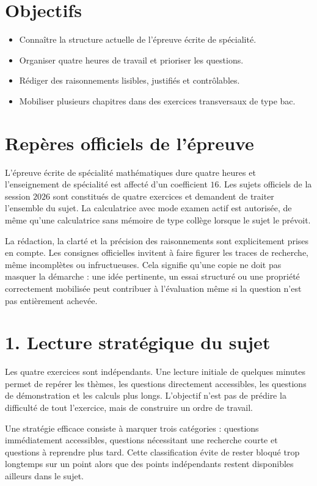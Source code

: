 
\section{Objectifs}
\begin{itemize}
\item Connaître la structure actuelle de l’épreuve écrite de spécialité.
\item Organiser quatre heures de travail et prioriser les questions.
\item Rédiger des raisonnements lisibles, justifiés et contrôlables.
\item Mobiliser plusieurs chapitres dans des exercices transversaux de type bac.
\end{itemize}

\section{Repères officiels de l’épreuve}
L’épreuve écrite de spécialité mathématiques dure quatre heures et l’enseignement de spécialité est affecté d’un coefficient $16$. Les sujets officiels de la session $2026$ sont constitués de quatre exercices et demandent de traiter l’ensemble du sujet. La calculatrice avec mode examen actif est autorisée, de même qu’une calculatrice sans mémoire de type collège lorsque le sujet le prévoit.

La rédaction, la clarté et la précision des raisonnements sont explicitement prises en compte. Les consignes officielles invitent à faire figurer les traces de recherche, même incomplètes ou infructueuses. Cela signifie qu’une copie ne doit pas masquer la démarche : une idée pertinente, un essai structuré ou une propriété correctement mobilisée peut contribuer à l’évaluation même si la question n’est pas entièrement achevée.

\section{1. Lecture stratégique du sujet}
Les quatre exercices sont indépendants. Une lecture initiale de quelques minutes permet de repérer les thèmes, les questions directement accessibles, les questions de démonstration et les calculs plus longs. L’objectif n’est pas de prédire la difficulté de tout l’exercice, mais de construire un ordre de travail.

Une stratégie efficace consiste à marquer trois catégories : questions immédiatement accessibles, questions nécessitant une recherche courte et questions à reprendre plus tard. Cette classification évite de rester bloqué trop longtemps sur un point alors que des points indépendants restent disponibles ailleurs dans le sujet.

